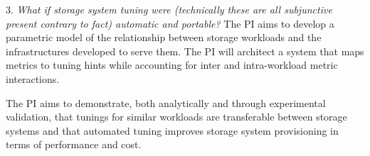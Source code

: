 \begin{myitemize}



\item[3.]
\emph{What if storage system tuning were (technically these are all subjunctive present contrary to fact) automatic and portable?} The PI aims to develop a
parametric model of the relationship between storage workloads and the
infrastructures developed to serve them.  %
The PI will architect a system that maps metrics to tuning hints while accounting for inter and intra-workload metric interactions.  

The PI aims to
demonstrate, both analytically and through experimental validation, that tunings for similar workloads are transferable between storage
systems and that automated tuning improves storage system provisioning in terms of performance and cost.
  



\end{myitemize}
